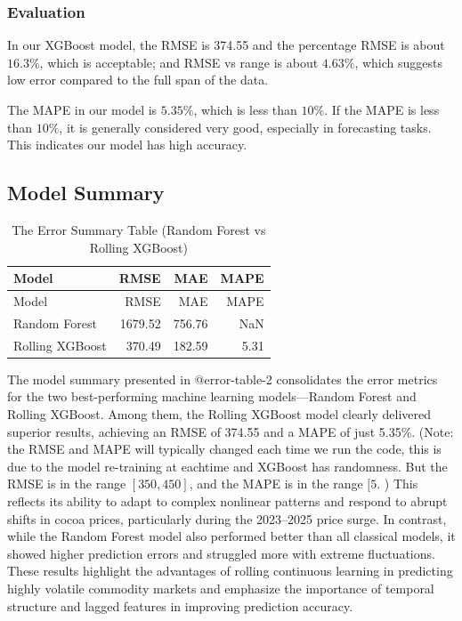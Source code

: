 \documentclass[
  letterpaper,
  DIV=11,
  numbers=noendperiod]{scrartcl}
\begin{document}
\hypertarget{evaluation}{%
\subsubsection{Evaluation}\label{evaluation}}

In our XGBoost model, the RMSE is 374.55 and the percentage RMSE is
about \(16.3\%\), which is acceptable; and RMSE vs range is about
\(4.63\%\), which suggests low error compared to the full span of the
data.

The MAPE in our model is \(5.35\%\), which is less than \(10 \%\). If
the MAPE is less than \(10\%\), it is generally considered very good,
especially in forecasting tasks. This indicates our model has high
accuracy.

\hypertarget{model-summary}{%
\subsection{Model Summary}\label{model-summary}}

\begin{longtable}[]{@{}lrrr@{}}
\caption{The Error Summary Table (Random Forest vs Rolling XGBoost)
}\tabularnewline
\toprule()
Model & RMSE & MAE & MAPE \\
\midrule()
\endfirsthead
\toprule()
Model & RMSE & MAE & MAPE \\
\midrule()
\endhead
Random Forest & 1679.52 & 756.76 & NaN \\
Rolling XGBoost & 370.49 & 182.59 & 5.31 \\
\bottomrule()
\end{longtable}

The model summary presented in @error-table-2 consolidates the error
metrics for the two best-performing machine learning models---Random
Forest and Rolling XGBoost. Among them, the Rolling XGBoost model
clearly delivered superior results, achieving an RMSE of 374.55 and a
MAPE of just 5.35\%. (Note: the RMSE and MAPE will typically changed
each time we run the code, this is due to the model re-training at
eachtime and XGBoost has randomness. But the RMSE is in the range
\([350, 450]\), and the MAPE is in the range \([5%
\). ) This reflects its ability to adapt to complex nonlinear patterns
and respond to abrupt shifts in cocoa prices, particularly during the
2023--2025 price surge. In contrast, while the Random Forest model also
performed better than all classical models, it showed higher prediction
errors and struggled more with extreme fluctuations. These results
highlight the advantages of rolling continuous learning in predicting
highly volatile commodity markets and emphasize the importance of
temporal structure and lagged features in improving prediction accuracy.
\end{document}
